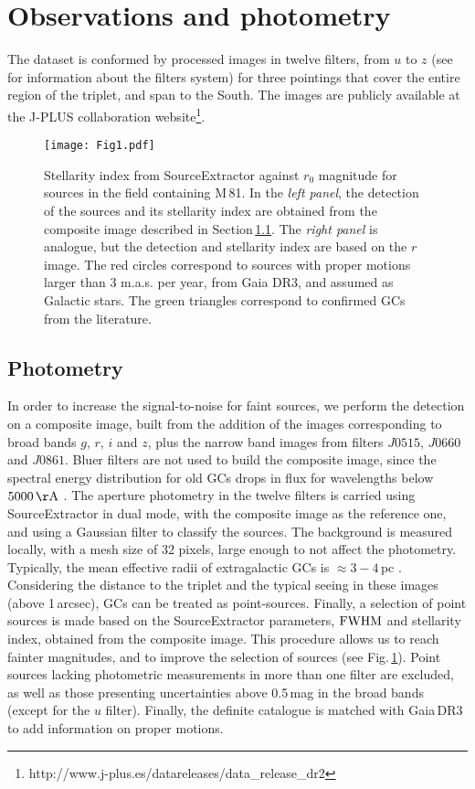 \documentclass[baaa]{baaa}
\begin{document}
\section{Observations and photometry}

The dataset is conformed by processed images in twelve filters, from $u$ to $z$ (see 
\citealt{cen19} for information about the filters system) for three pointings that cover 
the entire region of the triplet, and span to the South. The images are publicly available 
at the J-PLUS collaboration website\footnote{http://www.j-plus.es/datareleases/data\_release\_dr2}.

\begin{figure}[!t]
  \centering
  \texttt{[image: Fig1.pdf]}
  \caption{Stellarity index from S{\sc ource}E{\sc xtractor} against $r_0$ magnitude for
  sources in the field containing M\,81. In the {\it left panel}, the detection of the 
  sources and its stellarity index are obtained from the composite image described in 
  Section\,\ref{sec.phot}. The {\it right panel} is analogue, but the detection and 
  stellarity index are based on the $r$ image. The red circles correspond to sources with 
  proper motions larger than 3 m.a.s. per year, from Gaia DR3, and assumed as Galactic 
  stars. The green triangles correspond to confirmed GCs from the literature.}
  \label{Fig1}
\end{figure}

\subsection{Photometry}
\label{sec.phot}
  In order to increase the signal-to-noise for faint sources, we perform the 
  detection on a composite image, built from the addition of the images 
  corresponding to broad bands $g$, $r$, $i$ and $z$, plus the narrow band 
  images from filters $J0515$,  $J0660$ and $J0861$. Bluer filters are not
  used to build the composite image, since the spectral energy distribution for old GCs drops in flux for wavelengths below 
  $5000\,{\rm \AA}$ \citep[e.g.][]{bro06}. The aperture photometry in the 
  twelve filters is carried using 
  S{\sc ource}E{\sc xtractor} \citep{ber96} in dual mode, with the composite
  image as the reference one, and using a Gaussian filter to classify the 
  sources. The background is measured locally, with a mesh size of 32 pixels, 
  large enough to not affect the photometry. Typically, the mean effective radii 
  of extragalactic GCs is $\approx 3-4$\,pc \citep[e.g.][]{pen08,cas14}. 
  Considering the distance to the triplet and the typical seeing in these 
  images (above 1\,arcsec), GCs can be treated as point-sources. Finally, a 
  selection of point sources is made based on the S{\sc ource}E{\sc xtractor} 
  parameters, ${\rm FWHM}$ and stellarity index, obtained from the composite
  image. This procedure allows us to reach fainter magnitudes, and to improve
  the selection of sources (see Fig.\,\ref{Fig1}). Point sources lacking 
  photometric measurements in more than one filter are excluded, as well as
  those presenting uncertainties above 0.5\,mag in the broad bands (except for
  the $u$ filter). Finally, the definite catalogue is matched with Gaia\,DR3 
  \citep{gai21} to add information on proper motions.
  
\end{document}
